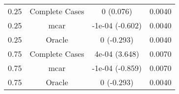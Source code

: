 \begin{table}[ht]
\centering
\begin{tabular}{cccc}
  \hline
  \hline
0.25 & Complete Cases & 0 (0.076) & 0.0040 \\ 
  0.25 & mcar & -1e-04 (-0.602) & 0.0040 \\ 
  0.25 & Oracle & 0 (-0.293) & 0.0040 \\ 
  0.75 & Complete Cases & 4e-04 (3.648) & 0.0070 \\ 
  0.75 & mcar & -1e-04 (-0.859) & 0.0070 \\ 
  0.75 & Oracle & 0 (-0.293) & 0.0040 \\ 
   \hline
\end{tabular}
\end{table}
